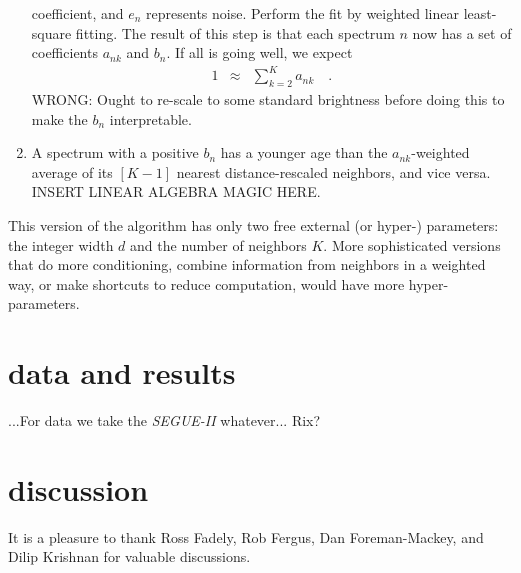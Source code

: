 \documentclass[12pt, preprint]{aastex}
\newcommand{\project}[1]{\textsl{#1}}
\begin{document}
\begin{enumerate}
  coefficient, and $e_n$ represents noise.  Perform the fit by
  weighted linear least-square fitting.  The result of this step is
  that each spectrum $n$ now has a set of coefficients $a_{nk}$ and
  $b_n$.  If all is going well, we expect
  \begin{eqnarray}
    1 &\approx& \sum_{k=2}^K a_{nk}
    \quad .
  \end{eqnarray}
  WRONG: Ought to re-scale to some standard brightness before doing
  this to make the $b_n$ interpretable.
\item A spectrum with a positive $b_n$ has a younger age than the
  $a_{nk}$-weighted average of its $[K-1]$ nearest distance-rescaled
  neighbors, and vice versa.  INSERT LINEAR ALGEBRA MAGIC HERE.
\end{enumerate}

This version of the algorithm has only two free external (or hyper-)
parameters: the integer width $d$ and the number of neighbors $K$.
More sophisticated versions that do more conditioning, combine
information from neighbors in a weighted way, or make shortcuts to
reduce computation, would have more hyper-parameters.

\section{data and results}

...For data we take the \project{SEGUE-II} whatever... Rix?

\section{discussion}

\acknowledgements It is a pleasure to thank
  Ross Fadely,
  Rob Fergus,
  Dan Foreman-Mackey, and
  Dilip Krishnan
for valuable discussions.
\end{document}
